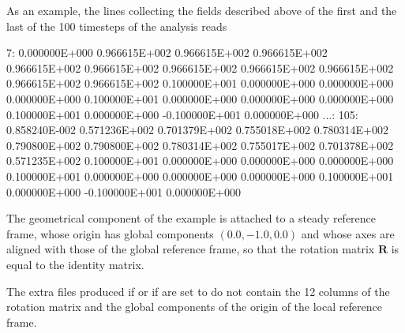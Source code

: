 As an example, the lines collecting the fields described above of the 
first and the last of the 100 timesteps of the analysis reads
\begin{inputfile}[frame=single]
  7: 0.000000E+000  0.966615E+002  0.966615E+002  0.966615E+002  0.966615E+002
     0.966615E+002  0.966615E+002  0.966615E+002  0.966615E+002  0.966615E+002
     0.966615E+002  0.100000E+001  0.000000E+000  0.000000E+000  0.000000E+000
     0.100000E+001  0.000000E+000  0.000000E+000  0.000000E+000  0.100000E+001
     0.000000E+000 -0.100000E+001  0.000000E+000
...:
105: 0.858240E-002  0.571236E+002  0.701379E+002  0.755018E+002  0.780314E+002
     0.790800E+002  0.790800E+002  0.780314E+002  0.755017E+002  0.701378E+002
     0.571235E+002  0.100000E+001  0.000000E+000  0.000000E+000  0.000000E+000
     0.100000E+001  0.000000E+000  0.000000E+000  0.000000E+000  0.100000E+001
     0.000000E+000 -0.100000E+001  0.000000E+000
\end{inputfile}
The geometrical component of the example is attached to a steady 
reference frame, whose origin has global components $( 0.0, -1.0, 0.0 )$ 
and whose axes are aligned with those of the global reference frame, so 
that the rotation matrix $\bm{R}$ is equal to the 
identity matrix.

The extra files produced if   
or if  are set to  
do not contain the 12 columns of the rotation matrix and 
the global components of the origin of the local reference frame.

